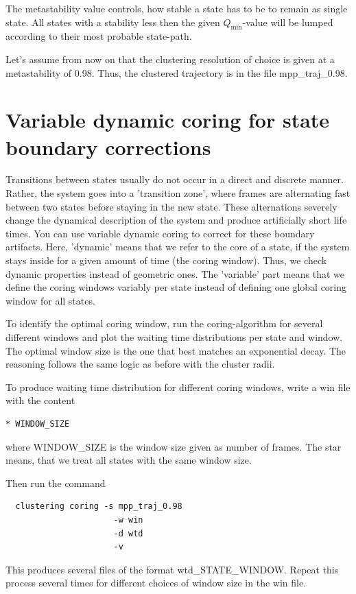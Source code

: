 \documentclass[12pt,a4paper,twoside,english,fleqn]{article}
\begin{document}
The metastability value controls, how stable a state has to be to remain as
single state. All states with a stability less then the given
$Q_\text{min}$-value will be lumped according to their most probable state-path.

Let's assume from now on that the clustering resolution of choice is given at
a metastability of 0.98. Thus, the clustered trajectory is in the file
mpp\_traj\_0.98.


\section{Variable dynamic coring for state boundary corrections}
Transitions between states usually do not occur in a direct and discrete manner.
Rather, the system goes into a 'transition zone', where frames are alternating
fast between two states before staying in the new state.
These alternations severely change the dynamical description of the system and
produce artificially short life times.
You can use variable dynamic coring to correct for these boundary artifacts.
Here, 'dynamic' means that we refer to the core of a state, if the system stays
inside for a given amount of time (the coring window). Thus, we check dynamic
properties instead of geometric ones. The 'variable' part means that we define
the coring windows variably per state instead of defining one global coring
window for all states.

To identify the optimal coring window, run the coring-algorithm for several
different windows and plot the waiting time distributions per state and window.
The optimal window size is the one that best matches an exponential decay.
The reasoning follows the same logic as before with the cluster radii.

To produce waiting time distribution for different coring windows, write a
{\ttfamily win} file with the content
\begin{lstlisting}[language=bash,basicstyle=\ttfamily]
  * WINDOW_SIZE
\end{lstlisting}
where {\ttfamily WINDOW\_SIZE} is the window size given as number of frames.
The star means, that we treat all states with the same window size.

Then run the command
\begin{lstlisting}
  clustering coring -s mpp_traj_0.98
                      -w win
                      -d wtd
                      -v
\end{lstlisting}

This produces several files of the format {\ttfamily wtd\_STATE\_WINDOW}.
Repeat this process several times for different choices of window size in the
{\ttfamily win} file.
\end{document}
